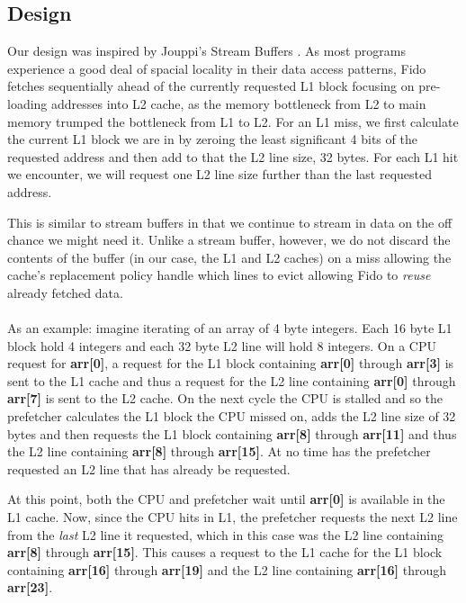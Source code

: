 \documentclass[11pt]{article}
\begin{document}
\subsection{Design}
Our design was inspired by Jouppi's Stream Buffers \cite{JouppiStreamBuff}. As most programs experience a good deal of spacial locality in their data access patterns, Fido fetches sequentially ahead of the currently requested L1 block focusing on pre-loading addresses into L2 cache, as the memory bottleneck from L2 to main memory trumped the bottleneck from L1 to L2. For an L1 miss, we first calculate the current L1 block we are in by zeroing the least significant 4 bits of the requested address and then add to that the L2 line size, 32 bytes. For each L1 hit we encounter, we will request one L2 line size further than the last requested address. 

This is similar to stream buffers in that we continue to stream in data on the off chance we might need it. Unlike a stream buffer, however, we do not discard the contents of the buffer (in our case, the L1 and L2 caches) on a miss allowing the cache's replacement policy handle which lines to evict allowing Fido to \textit{reuse} already fetched data. 
\\
\\
As an example: imagine iterating of an array of 4 byte integers. Each 16 byte L1 block hold 4 integers and each 32 byte L2 line will hold 8 integers. On a CPU request for \textbf{arr[0]}, a request for the L1 block containing \textbf{arr[0]} through \textbf{arr[3]} is sent to the L1 cache and thus a request for the L2 line containing \textbf{arr[0]} through \textbf{arr[7]} is sent to the L2 cache. On the next cycle the CPU is stalled and so the prefetcher calculates the L1 block the CPU missed on, adds the L2 line size of 32 bytes and then requests the L1 block containing \textbf{arr[8]} through \textbf{arr[11]} and thus the L2 line containing \textbf{arr[8]} through \textbf{arr[15]}. At no time has the prefetcher requested an L2 line that has already be requested. 

At this point, both the CPU and prefetcher wait until \textbf{arr[0]} is available in the L1 cache. Now, since the CPU hits in L1, the prefetcher requests the next L2 line from the \textit{last} L2 line it requested, which in this case was the L2 line containing \textbf{arr[8]} through \textbf{arr[15]}. This causes a request to the L1 cache for the L1 block containing \textbf{arr[16]} through \textbf{arr[19]} and the L2 line containing \textbf{arr[16]} through \textbf{arr[23]}. 
\end{document}
